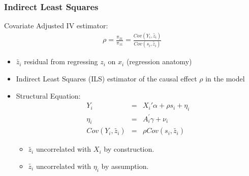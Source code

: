 \documentclass[pdftex]{beamer}
\begin{document}
\begin{frame}
\frametitle{Indirect Least Squares}


 Covariate Adjusted IV estimator:
\begin{eqnarray*}
  \rho=\frac{\pi_{21}}{\pi_{11}}=\frac{Cov\left(Y_{i}, \tilde{z_{i}}\right)}{Cov\left(s_{i},\tilde{ z_{i}}\right)}
\end{eqnarray*}
\begin {itemize}


\item $\tilde{z_{i}}$ residual from regressing $z_{i}$ on $x_{i}$ (regression anatomy)
\item Indirect Least Squares (ILS) estimator of the causal effect $\rho$ in the model
\item Structural Equation:
\begin{eqnarray*}
  Y_{i} &=& X_{i}' \alpha+ \rho s_{i}+\eta_{i}  \\
  \eta_{i}&=& A_{i}^{'}\gamma+ \nu_{i} \\
  Cov\left(Y_{i}, \tilde{z_{i}}\right)&=& \rho Cov\left(s_{i}, \tilde{z_{i}}\right)
\end{eqnarray*}
      \begin {itemize}
     \item $\tilde{z_{i}}$ uncorrelated with $X_{i}$ by construction.
     \item $\tilde{z_{i}}$ uncorrelated with $\eta_{i}$ by assumption.
\end {itemize}
\end {itemize}

\end{frame}






\end{document}
